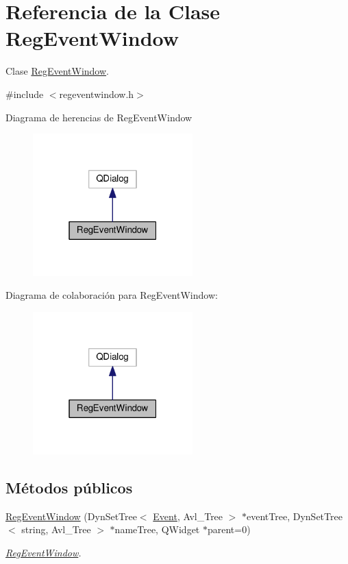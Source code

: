 \hypertarget{class_reg_event_window}{}\section{Referencia de la Clase Reg\+Event\+Window}
\label{class_reg_event_window}


Clase \hyperlink{class_reg_event_window}{Reg\+Event\+Window}.  




{\ttfamily \#include $<$regeventwindow.\+h$>$}



Diagrama de herencias de Reg\+Event\+Window\nopagebreak
\begin{figure}[H]
\begin{center}
\leavevmode
\includegraphics[width=175pt]{class_reg_event_window__inherit__graph}
\end{center}
\end{figure}


Diagrama de colaboración para Reg\+Event\+Window\+:\nopagebreak
\begin{figure}[H]
\begin{center}
\leavevmode
\includegraphics[width=175pt]{class_reg_event_window__coll__graph}
\end{center}
\end{figure}
\subsection*{Métodos públicos}
\begin{DoxyCompactItemize}
\item 
\hyperlink{class_reg_event_window_a746fa6180a87823eb6403d1f26b7a270}{Reg\+Event\+Window} (Dyn\+Set\+Tree$<$ \hyperlink{class_event}{Event}, Avl\+\_\+\+Tree $>$ $\ast$event\+Tree, Dyn\+Set\+Tree$<$ string, Avl\+\_\+\+Tree $>$ $\ast$name\+Tree, Q\+Widget $\ast$parent=0)
\begin{DoxyCompactList}\small\item\em \hyperlink{class_reg_event_window}{Reg\+Event\+Window}. \end{DoxyCompactList}\end{DoxyCompactItemize}
